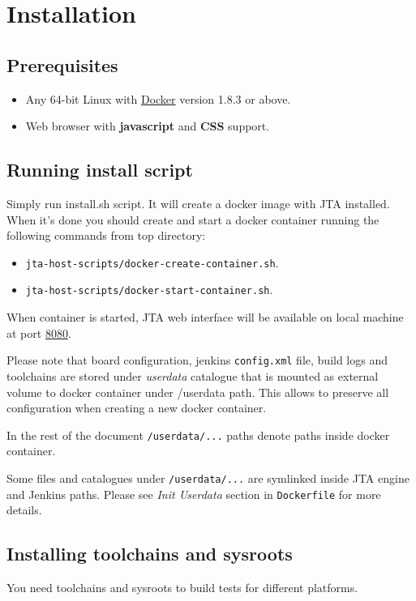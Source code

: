 \section{Installation}
\label{sec:install}

\subsection{Prerequisites}
\label{sec:prereq}

\begin{itemize}
\item Any 64-bit Linux with \href{https://www.docker.com/}{Docker} version 1.8.3 or above.
\item Web browser with \textbf{javascript} and \textbf{CSS} support.
\end{itemize}
\subsection{Running install script}
\label{sec:inst-steps}

Simply run install.sh script. It will create a docker image with JTA installed. When it's done you should create and start a docker container running the following commands from top directory: 
\begin{itemize}
\item \texttt{jta-host-scripts/docker-create-container.sh}.
\item \texttt{jta-host-scripts/docker-start-container.sh}.
\end{itemize}

When container is started, JTA web interface will be available on local machine at port \href{http://localhost:8080}{8080}.

Please note that board configuration, jenkins \texttt{config.xml} file, build logs and toolchains are stored under \textit{userdata} catalogue that is mounted as external volume to docker container under /userdata path. This allows to preserve all configuration when creating a new docker container. 

In the rest of the document \texttt{/userdata/...} paths denote paths inside docker container.

Some files and catalogues under \texttt{/userdata/...} are symlinked inside JTA engine and Jenkins paths. Please see \textit{Init Userdata} section in \texttt{Dockerfile} for more details.

\subsection{Installing toolchains and sysroots}
You need toolchains and sysroots to build tests for different platforms. 
\label{sec:toolchain-install}
